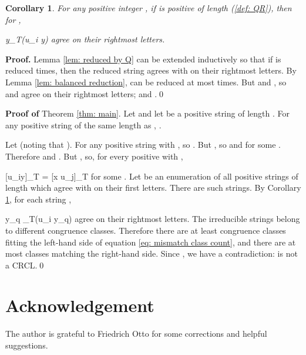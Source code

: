 \documentclass[12pt,a4paper]{article}
\newtheorem{corollary}[theorem]{Corollary}
\newcommand{\irr}{{\text{\rm irr}}}
\numberwithin{equation}{section}
\newcommand{\be}{}
\newcommand{\hb}{\hfil\break}
\begin{document}
\begin{corollary}
\label{cor: rightmost k}
For any positive integer , if  is positive
of  length  (\ref{def: QR}), then
for ,
\be
y\quad{}\quad \irr_T(u_i y)
\ee
agree on their rightmost  letters.
\end{corollary}

{\bf Proof.}
Lemma \ref{lem: reduced by Q} can be extended inductively
so that if  is reduced  times, then
the reduced string agrees with  on their rightmost
 letters.  By Lemma \ref{lem: balanced reduction},
 can be reduced at most  times.
But  and ,
so  and  agree on their rightmost
 letters; and .\qed

\hb

{\bf Proof of} Theorem \ref{thm: main}.
Let  and let  be a positive
string of length .  For any positive string
 of the same length as , .

Let  (noting that ).
For any positive string  with , 
so .  But
, so
 and  for some .
Therefore  and
. But ,
so, for every positive  with ,
\be
\takeanumber
\tag{\thetheorem}
\label{eq: mismatch class count}
[u_iy]_T = [x u_j]_T
\ee
for some .
Let  be an enumeration of all positive strings 
of length  which agree with  on their first 
letters.  There are  such strings. By Corollary
\ref{cor: rightmost k}, for each string ,
\be
y_q \quad{}\quad  \irr_T(u_i y_q)
\ee
agree on their rightmost
 letters.  The irreducible strings belong to
different congruence classes. Therefore there are
at least  congruence classes fitting the left-hand
side of equation \ref{eq: mismatch class count}, and there
are at most  classes matching the right-hand side.
Since , we have  a contradiction:  is not
a CRCL.\qed

\section{Acknowledgement}
The author is grateful to Friedrich Otto
for some corrections and helpful suggestions.
\end{document}

